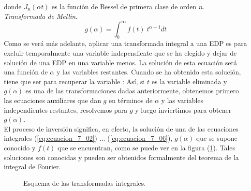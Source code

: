 donde $J_{n}(\alpha t)$ es la función de Bessel de primera clase de orden $n$.
\\
\emph{Transformada de Mellin.}
\begin{equation}
g(\alpha)= \int_{0}^{\infty} f(t) \; t^{\alpha-1} dt
\label{eq:ecuacion_7_06}
\end{equation}
Como se verá más adelante, aplicar una transformada integral a una EDP es para excluir temporalmente una variable independiente que se ha elegido y dejar de solución de una EDP en una variable menos. La solución de esta ecuación será una función de $\alpha$ y las variables restantes. Cuando se ha obtenido esta solución, tiene que ser  para recuperar la variable : Así, si $t$ es la variable eliminada y $g(\alpha)$ es una de las transformaciones dadas anteriormente, obtenemos primero las ecuaciones auxiliares que dan $g$ en términos de $\alpha$ y las variables independientes restantes, resolvemos para $g$ y luego inviertimos para obtener $g(\alpha)$.
\\
El proceso de inversión significa, en efecto, la solución de una de las ecuaciones integrales (\ref{eq:ecuacion_7_02}) $\ldots$ (\ref{eq:ecuacion_7_06}), $g(\alpha)$ que se supone conocido y $f(t)$ que se encuentran, como se puede ver en la figura (\ref{fig:figura_01}). Tales soluciones son conocidas y pueden ser obtenidos formalmente del teorema de la integral de Fourier.
\begin{figure}[H]
\centering

\caption{Esquema de las transformadas integrales.}
\label{fig:figura_01}
\end{figure}
